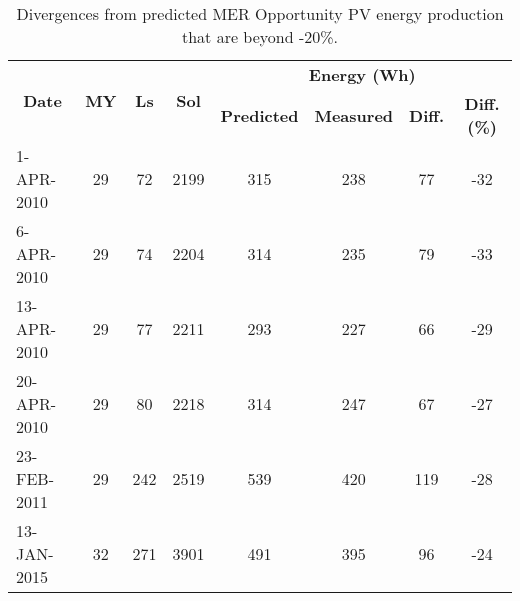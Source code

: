 \begin{table}[h]
    \centering
    \caption{Divergences from predicted MER Opportunity PV energy production that are beyond -20\%.}
    \label{tab:divergences-less-than-m20pc}
    \begin{tabular}{|l|c|c|c|c|c|c|c|}
    \hline
    \multicolumn{1}{|c|}{\multirow{2}{*}{\textbf{Date}}} & \multirow{2}{*}{\textbf{MY}} & \multirow{2}{*}{\textbf{Ls}} & \multirow{2}{*}{\textbf{Sol}} & \multicolumn{4}{c|}{\textbf{Energy (Wh)}} \\ \cline{5-8}
    \multicolumn{1}{|c|}{} &  &  &  & \textbf{Predicted} & \textbf{Measured} & \textbf{Diff.} & \textbf{Diff. (\%)} \\ \hline
    1-APR-2010 & 29 & 72 & 2199 & 315 & 238 & 77 & -32 \\
    6-APR-2010 & 29 & 74 & 2204 & 314 & 235 & 79 & -33 \\
    13-APR-2010 & 29 & 77 & 2211 & 293 & 227 & 66 & -29 \\
    20-APR-2010 & 29 & 80 & 2218 & 314 & 247 & 67 & -27 \\ \hline
    23-FEB-2011 & 29 & 242 & 2519 & 539 & 420 & 119 & -28 \\ \hline
    13-JAN-2015 & 32 & 271 & 3901 & 491 & 395 & 96 & -24 \\ \hline
    \end{tabular}
\end{table}
